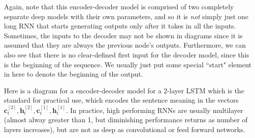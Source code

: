 \begin{figure}[H]
      \caption{} 
      \label{fig:encoder_decoder_rnn}
    \end{figure}

    Again, note that this encoder-decoder model is comprised of two completely separate deep models with their own parameters, and so it is \textit{not} simply just one long RNN that starts generating outputs only after it takes in all the inputs. Sometimes, the inputs to the decoder may not be shown in diagrams since it is assumed that they are always the previous node's outputs. Furthermore, we can also see that there is no clear-defined first input for the decoder model, since this is the beginning of the sequence. We usually just put some special ``start" element in here to denote the beginning of the output. 

    Here is a diagram for a encoder-decoder model for a 2-layer LSTM which is the standard for practical use, which encodes the sentence meaning in the vectors $\mathbf{c}_t^{[2]}, \mathbf{h}_t ^{[2]}, \mathbf{c}_t^{[1]}, \mathbf{h}_t^{[1]}$. In practice, high performing RNNs are usually multilayer (almost alway greater than 1, but diminishing performance returns as number of layers increases), but are not as deep as convolutional or feed forward networks. 

